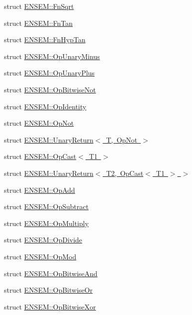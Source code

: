 \begin{DoxyCompactItemize}
\item 
struct \mbox{\hyperlink{structENSEM_1_1FnSqrt}{E\+N\+S\+E\+M\+::\+Fn\+Sqrt}}
\item 
struct \mbox{\hyperlink{structENSEM_1_1FnTan}{E\+N\+S\+E\+M\+::\+Fn\+Tan}}
\item 
struct \mbox{\hyperlink{structENSEM_1_1FnHypTan}{E\+N\+S\+E\+M\+::\+Fn\+Hyp\+Tan}}
\item 
struct \mbox{\hyperlink{structENSEM_1_1OpUnaryMinus}{E\+N\+S\+E\+M\+::\+Op\+Unary\+Minus}}
\item 
struct \mbox{\hyperlink{structENSEM_1_1OpUnaryPlus}{E\+N\+S\+E\+M\+::\+Op\+Unary\+Plus}}
\item 
struct \mbox{\hyperlink{structENSEM_1_1OpBitwiseNot}{E\+N\+S\+E\+M\+::\+Op\+Bitwise\+Not}}
\item 
struct \mbox{\hyperlink{structENSEM_1_1OpIdentity}{E\+N\+S\+E\+M\+::\+Op\+Identity}}
\item 
struct \mbox{\hyperlink{structENSEM_1_1OpNot}{E\+N\+S\+E\+M\+::\+Op\+Not}}
\item 
struct \mbox{\hyperlink{structENSEM_1_1UnaryReturn_3_01T_00_01OpNot_01_4}{E\+N\+S\+E\+M\+::\+Unary\+Return$<$ T, Op\+Not $>$}}
\item 
struct \mbox{\hyperlink{structENSEM_1_1OpCast}{E\+N\+S\+E\+M\+::\+Op\+Cast$<$ T1 $>$}}
\item 
struct \mbox{\hyperlink{structENSEM_1_1UnaryReturn_3_01T2_00_01OpCast_3_01T1_01_4_01_4}{E\+N\+S\+E\+M\+::\+Unary\+Return$<$ T2, Op\+Cast$<$ T1 $>$ $>$}}
\item 
struct \mbox{\hyperlink{structENSEM_1_1OpAdd}{E\+N\+S\+E\+M\+::\+Op\+Add}}
\item 
struct \mbox{\hyperlink{structENSEM_1_1OpSubtract}{E\+N\+S\+E\+M\+::\+Op\+Subtract}}
\item 
struct \mbox{\hyperlink{structENSEM_1_1OpMultiply}{E\+N\+S\+E\+M\+::\+Op\+Multiply}}
\item 
struct \mbox{\hyperlink{structENSEM_1_1OpDivide}{E\+N\+S\+E\+M\+::\+Op\+Divide}}
\item 
struct \mbox{\hyperlink{structENSEM_1_1OpMod}{E\+N\+S\+E\+M\+::\+Op\+Mod}}
\item 
struct \mbox{\hyperlink{structENSEM_1_1OpBitwiseAnd}{E\+N\+S\+E\+M\+::\+Op\+Bitwise\+And}}
\item 
struct \mbox{\hyperlink{structENSEM_1_1OpBitwiseOr}{E\+N\+S\+E\+M\+::\+Op\+Bitwise\+Or}}
\item 
struct \mbox{\hyperlink{structENSEM_1_1OpBitwiseXor}{E\+N\+S\+E\+M\+::\+Op\+Bitwise\+Xor}}
\item 

\end{DoxyCompactItemize}
